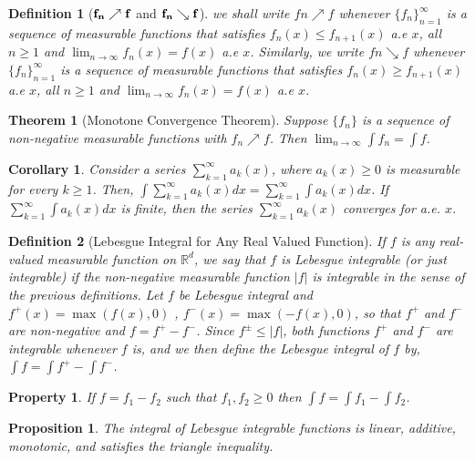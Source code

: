 \documentclass{report}
\theoremstyle{upthm}
\newtheorem{thm}{Theorem}
\newtheorem{defn}{Definition}
\newtheorem{cor}{Corollary}
\newtheorem{prop}{Proposition}
\newtheorem{property}{Property}
\newcommand{\reals}{\mathbb{R}}
\newcommand{\set}[1]{\big\lbrace #1 \big\rbrace}
\begin{document}
\begin{defn}[$\bf f_n \nearrow f$ and $\bf f_n \searrow f$]
	we shall write $fn \nearrow f$	whenever $\set{f_n}_{n=1}^{\infty}$ is a sequence of measurable functions that satisfies $ f_n(x) \leq f_{n+1}(x)$ a.e $x$, all $n \geq 1$ and $\lim_{n \rightarrow \infty} f_n(x) = f(x)$ a.e $x$. Similarly, we write $fn \searrow f$	whenever $\set{f_n}_{n=1}^{\infty}$ is a sequence of measurable functions that satisfies $ f_n(x) \geq f_{n+1}(x)$ a.e $x$, all $n \geq 1$ and $\lim_{n \rightarrow \infty} f_n(x) = f(x)$ a.e $x$.
\end{defn}

\begin{thm}[Monotone Convergence Theorem]
	Suppose $\set{f_n}$ is a sequence of non-negative measurable functions with $ f_n \nearrow f$. Then $\lim_{n \rightarrow \infty} \int f_n = \int f$.
\end{thm}

\begin{cor}
	Consider a series $ \sum_{k=1}^{\infty} a_k(x)$, where $a_k(x) \geq 0$ is measurable for every $k \geq 1$. Then, $\int \sum_{k=1}^{\infty} a_k(x) dx  = \sum_{k=1}^{\infty} \int a_k(x) dx $. If $\sum_{k=1}^{\infty} \int a_k(x) dx$ is finite, then the series $ \sum_{k=1}^{\infty} a_k(x)$ converges for a.e. $x$.
\end{cor}

\begin{defn}[Lebesgue Integral for Any Real Valued Function]
	If $f$ is any real-valued measurable function on $\reals^d$, we say that $f$ is 	Lebesgue integrable (or just integrable) if the non-negative measurable function $|f|$ is integrable in the sense of the previous definitions. Let $f$ be Lebesgue integral and $f^+(x) = \max(f(x), 0)$ , $f^-(x) = \max(-f(x), 0)$, so that $f^+$ and $f^-$ are non-negative and $f = f^+ - f^-$. Since $f^{\pm}  \leq |f|$, both functions $f^+$ and $f^-$ are integrable whenever $f$ is, and we then define the Lebesgue integral of $f$ by,
	$\int f = \int f^+ - \int f^-$.
\end{defn}

\begin{property}
	If $f = f_1 - f_2$ such that $f_1, f_2 \geq 0$ then $\int f = \int f_1 - \int f_2$.
\end{property}

\begin{prop}
	The integral of Lebesgue integrable functions is linear, additive, monotonic, and satisfies the triangle inequality. 
\end{prop}
\end{document}
